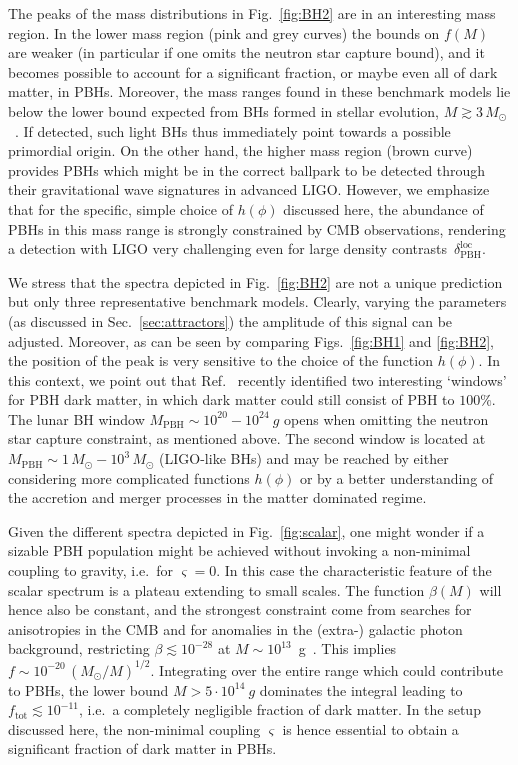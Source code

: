 The peaks of the mass distributions in Fig.~\ref{fig:BH2} are in an interesting mass region. In the lower mass region (pink and grey curves) the bounds on $f(M)$ are weaker (in particular if one omits the neutron star capture bound), and it becomes possible to account for a significant fraction, or maybe even all of dark matter, in PBHs. Moreover, the mass ranges found in these benchmark models lie below the lower bound expected from BHs formed in stellar evolution, $M \gtrsim 3 \, M_\odot$~\cite{Misner:1974qy}. If detected, such light BHs thus immediately point towards a possible primordial origin. On the other hand, the higher mass region (brown curve) provides PBHs which might be in the correct ballpark to be detected through their gravitational wave signatures in advanced LIGO. However, we emphasize that for the specific, simple choice of $h(\phi)$ discussed here, the abundance of PBHs in this mass range is strongly constrained by CMB observations, rendering a detection with LIGO very challenging even for large density contrasts~$\delta_\text{PBH}^\text{loc}$.
%



We stress that the spectra depicted in Fig.~\ref{fig:BH2} are not a unique prediction but only three representative benchmark models. Clearly, varying the parameters (as discussed in Sec.~\ref{sec:attractors}) the amplitude of this signal can be adjusted. Moreover, as can be seen by comparing Figs.~\ref{fig:BH1} and \ref{fig:BH2}, the position of the peak is very sensitive to the choice of the function $h(\phi)$. In this context, we point out that Ref.~\cite{Carr:2016drx} recently identified two interesting `windows' for PBH dark matter, in which dark matter could still consist of PBH to $100\%$. The lunar BH window $M_\text{PBH} \sim 10^{20} - 10^{24}~g$ opens when omitting the neutron star capture constraint, as mentioned above. The second window is located at $M_\text{PBH} \sim 1\,  M_\odot - 10^3 \, M_\odot$ (LIGO-like BHs) and may be reached by either considering more complicated functions $h(\phi)$ or by a better understanding of the accretion and merger processes in the matter dominated regime.
 

Given the different spectra depicted in Fig.~\ref{fig:scalar}, one might wonder if a sizable PBH population might be achieved without invoking a non-minimal coupling to gravity, i.e.\ for $\varsigma = 0$. In this case the characteristic feature of the scalar spectrum is a plateau extending to small scales. The function $\beta(M)$ will hence also be constant, and the strongest constraint come from searches for anisotropies in the CMB and for anomalies in the (extra-) galactic photon background, restricting $\beta \lesssim 10^{-28}$ at $M \sim 10^{13}$~g~\cite{Carr:2009jm}. This implies $f \sim 10^{-20} \, (M_\odot/M)^{1/2}$. Integrating over the entire range which could contribute to PBHs, the lower bound $M > 5 \cdot 10^{14}~g $ dominates the integral leading to $f_\text{tot} \lesssim 10^{-11}$, i.e.\ a completely negligible fraction of dark matter. In the setup discussed here, the non-minimal coupling $\varsigma$ is hence essential to obtain a significant fraction of dark matter in PBHs.